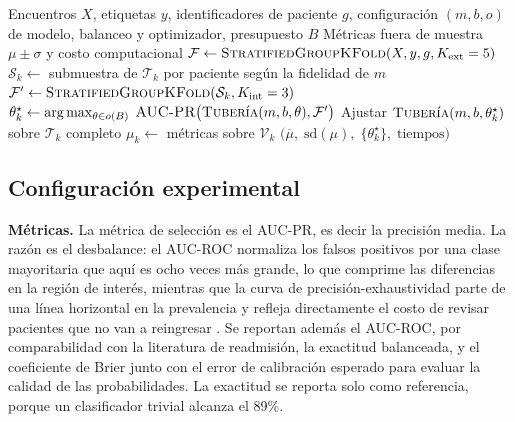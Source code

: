 \documentclass[pdflatex,sn-mathphys-num]{sn-jnl}
\begin{document}
\begin{algorithm}
\caption{Evaluación anidada agrupada por paciente de una configuración}\label{alg:protocolo}
\begin{algorithmic}[1]
\Require Encuentros $X$, etiquetas $y$, identificadores de paciente $g$, configuración $(m, b, o)$ de modelo, balanceo y optimizador, presupuesto $B$
\Ensure Métricas fuera de muestra $\mu \pm \sigma$ y costo computacional
\State $\mathcal{F} \gets \textsc{StratifiedGroupKFold}(X, y, g, K_{\text{ext}}=5)$
    \State $\mathcal{S}_k \gets$ submuestra de $\mathcal{T}_k$ por paciente según la fidelidad de $m$
    \State $\mathcal{F}' \gets \textsc{StratifiedGroupKFold}(\mathcal{S}_k, K_{\text{int}}=3)$
    \State $\theta_k^\star \gets \arg\max_{\theta \in o(B)} \; \textsc{AUC-PR}\big(\textsc{Tubería}(m,b,\theta), \mathcal{F}'\big)$
    \State Ajustar $\textsc{Tubería}(m, b, \theta_k^\star)$ sobre $\mathcal{T}_k$ completo
    \State $\mu_k \gets$ métricas sobre $\mathcal{V}_k$
\EndFor
\State \Return $\big(\overline{\mu},\; \mathrm{sd}(\mu),\; \{\theta_k^\star\},\; \text{tiempos}\big)$
\end{algorithmic}
\end{algorithm}

\subsection{Configuración experimental}\label{subsec:config}

\textbf{Métricas.} La métrica de selección es el AUC-PR, es decir la precisión media. La razón es el desbalance: el AUC-ROC normaliza los falsos positivos por una clase mayoritaria que aquí es ocho veces más grande, lo que comprime las diferencias en la región de interés, mientras que la curva de precisión-exhaustividad parte de una línea horizontal en la prevalencia y refleja directamente el costo de revisar pacientes que no van a reingresar \cite{bib_saito,bib_davis}. Se reportan además el AUC-ROC, por comparabilidad con la literatura de readmisión, la exactitud balanceada, y el coeficiente de Brier \cite{bib_brier} junto con el error de calibración esperado para evaluar la calidad de las probabilidades. La exactitud se reporta solo como referencia, porque un clasificador trivial alcanza el 89\%.
\end{document}
